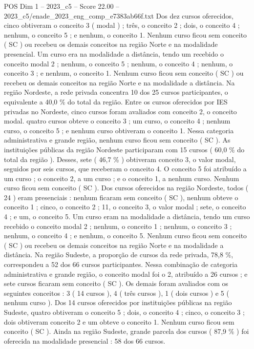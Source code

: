 \begin{textsample}{POS Dim 1 – 2023\_c5 – Score 22.00 – 2023\_c5/enade\_2023\_eng\_comp\_e7383ab66f.txt}
Dos dez cursos oferecidos, cinco obtiveram o conceito 3 ( modal ) ; três, o conceito 2 ; dois, o conceito 4 ; nenhum, o conceito 5 ; e nenhum, o conceito 1.
Nenhum curso ficou sem conceito ( SC ) ou recebeu os demais conceitos na região Norte e na modalidade presencial.
Um curso era na modalidade a distância, tendo um recebido o conceito modal 2 ; nenhum, o conceito 5 ; nenhum, o conceito 4 ; nenhum, o conceito 3 ; e nenhum, o conceito 1.
Nenhum curso ficou sem conceito ( SC ) ou recebeu os demais conceitos na região Norte e na modalidade a distância.
Na região Nordeste, a rede privada concentra 10 dos 25 cursos participantes, o equivalente a 40,0 \% do total da região.
Entre os cursos oferecidos por IES privadas no Nordeste, cinco cursos foram avaliados com conceito 2, o conceito modal. quatro cursos obteve o conceito 3 ; um curso, o conceito 4 ; nenhum curso, o conceito 5 ; e nenhum curso obtiveram o conceito 1.
Nessa categoria administrativa e grande região, nenhum curso ficou sem conceito ( SC ).
As instituições públicas da região Nordeste participaram com 15 cursos ( 60,0 \% do total da região ).
Desses, sete ( 46,7 \% ) obtiveram conceito 3, o valor modal, seguidos por seis cursos, que receberam o conceito 4.
O conceito 5 foi atribuído a um curso ; o conceito 2, a um curso ; e o conceito 1, a nenhum curso.
Nenhum curso ficou sem conceito ( SC ).
Dos cursos oferecidos na região Nordeste, todos ( 24 ) eram presenciais : nenhum ficaram sem conceito ( SC ), nenhum obteve o conceito 1 ; cinco, o conceito 2 ; 11, o conceito 3, o valor modal ; sete, o conceito 4 ; e um, o conceito 5.
Um curso eram na modalidade a distância, tendo um curso recebido o conceito modal 2 ; nenhum, o conceito 1 ; nenhum, o conceito 3 ; nenhum, o conceito 4 ; e nenhum, o conceito 5.
Nenhum curso ficou sem conceito ( SC ) ou recebeu os demais conceitos na região Norte e na modalidade a distância.
Na região Sudeste, a proporção de cursos da rede privada, 78,8 \%, correspondeu a 52 dos 66 cursos participantes.
Nessa combinação de categoria administrativa e grande região, o conceito modal foi o 2, atribuído a 26 cursos ; e sete cursos ficaram sem conceito ( SC ).
Os demais foram avaliados com os seguintes conceitos : 3 ( 14 cursos ), 4 ( três cursos ), 1 ( dois cursos ) e 5 ( nenhum curso ).
Dos 14 cursos oferecidos por instituições públicas na região Sudeste, quatro obtiveram o conceito 5 ; dois, o conceito 4 ; cinco, o conceito 3 ; dois obtiveram conceito 2 e um obteve o conceito 1.
Nenhum curso ficou sem conceito ( SC ).
Ainda na região Sudeste, grande parcela dos cursos ( 87,9 \% ) foi oferecida na modalidade presencial : 58 dos 66 cursos.

\end{textsample}

